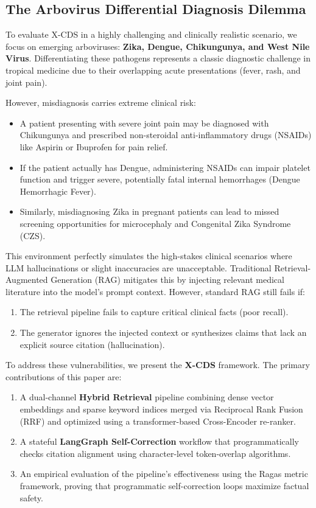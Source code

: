 \documentclass[sn-mathphys,Numbered]{sn-jnl}%
\begin{document}
\subsection{The Arbovirus Differential Diagnosis Dilemma}
To evaluate X-CDS in a highly challenging and clinically realistic scenario, we focus on emerging arboviruses: \textbf{Zika, Dengue, Chikungunya, and West Nile Virus}. Differentiating these pathogens represents a classic diagnostic challenge in tropical medicine due to their overlapping acute presentations (fever, rash, and joint pain). 

However, misdiagnosis carries extreme clinical risk:
\begin{itemize}
    \item A patient presenting with severe joint pain may be diagnosed with Chikungunya and prescribed non-steroidal anti-inflammatory drugs (NSAIDs) like Aspirin or Ibuprofen for pain relief.
    \item If the patient actually has Dengue, administering NSAIDs can impair platelet function and trigger severe, potentially fatal internal hemorrhages (Dengue Hemorrhagic Fever).
    \item Similarly, misdiagnosing Zika in pregnant patients can lead to missed screening opportunities for microcephaly and Congenital Zika Syndrome (CZS).
\end{itemize}

This environment perfectly simulates the high-stakes clinical scenarios where LLM hallucinations or slight inaccuracies are unacceptable. Traditional Retrieval-Augmented Generation (RAG) mitigates this by injecting relevant medical literature into the model's prompt context. However, standard RAG still fails if:
\begin{enumerate}
    \item The retrieval pipeline fails to capture critical clinical facts (poor recall).
    \item The generator ignores the injected context or synthesizes claims that lack an explicit source citation (hallucination).
\end{enumerate}

To address these vulnerabilities, we present the \textbf{X-CDS} framework. The primary contributions of this paper are:
\begin{enumerate}
    \item A dual-channel \textbf{Hybrid Retrieval} pipeline combining dense vector embeddings and sparse keyword indices merged via Reciprocal Rank Fusion (RRF) and optimized using a transformer-based Cross-Encoder re-ranker.
    \item A stateful \textbf{LangGraph Self-Correction} workflow that programmatically checks citation alignment using character-level token-overlap algorithms.
    \item An empirical evaluation of the pipeline's effectiveness using the Ragas metric framework, proving that programmatic self-correction loops maximize factual safety.
\end{enumerate}
\end{document}
